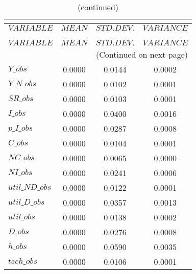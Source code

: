  
\begin{center}
\begin{longtable}{lccc} 
\caption{THEORETICAL MOMENTS}\\
 \label{Table:th_moments}\\
\toprule 
$VARIABLE       $	 & 	 $         MEAN$	 & 	 $    STD. DEV.$	 & 	 $     VARIANCE$\\
\midrule \endfirsthead 
\caption{(continued)}\\
 \toprule \\ 
$VARIABLE       $	 & 	 $         MEAN$	 & 	 $    STD. DEV.$	 & 	 $     VARIANCE$\\
\midrule \endhead 
\midrule \multicolumn{4}{r}{(Continued on next page)} \\ \bottomrule \endfoot 
\bottomrule \endlastfoot 
$Y\_obs         $	 & 	       0.0000	 & 	       0.0144	 & 	       0.0002 \\ 
$Y\_N\_obs      $	 & 	       0.0000	 & 	       0.0102	 & 	       0.0001 \\ 
$SR\_obs        $	 & 	       0.0000	 & 	       0.0103	 & 	       0.0001 \\ 
$I\_obs         $	 & 	       0.0000	 & 	       0.0400	 & 	       0.0016 \\ 
$p\_I\_obs      $	 & 	       0.0000	 & 	       0.0287	 & 	       0.0008 \\ 
$C\_obs         $	 & 	       0.0000	 & 	       0.0104	 & 	       0.0001 \\ 
$NC\_obs        $	 & 	       0.0000	 & 	       0.0065	 & 	       0.0000 \\ 
$NI\_obs        $	 & 	       0.0000	 & 	       0.0241	 & 	       0.0006 \\ 
$util\_ND\_obs  $	 & 	       0.0000	 & 	       0.0122	 & 	       0.0001 \\ 
$util\_D\_obs   $	 & 	       0.0000	 & 	       0.0357	 & 	       0.0013 \\ 
$util\_obs      $	 & 	       0.0000	 & 	       0.0138	 & 	       0.0002 \\ 
$D\_obs         $	 & 	       0.0000	 & 	       0.0276	 & 	       0.0008 \\ 
$h\_obs         $	 & 	       0.0000	 & 	       0.0590	 & 	       0.0035 \\ 
$tech\_obs      $	 & 	       0.0000	 & 	       0.0106	 & 	       0.0001 \\ 
\end{longtable}
 \end{center}
